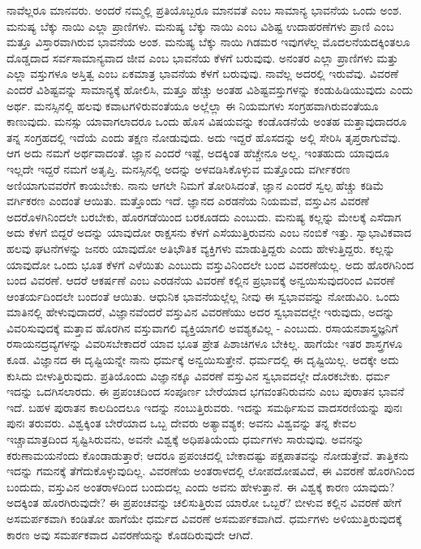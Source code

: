 ನಾವೆಲ್ಲರೂ ಮಾನವರು. ಅಂದರೆ ನಮ್ಮಲ್ಲಿ ಪ್ರತಿಯೊಬ್ಬರೂ ಮಾನವತೆ ಎಂಬ ಸಾಮಾನ್ಯ ಭಾವನೆಯ ಒಂದು ಅಂಶ. ಮನುಷ್ಯ ಬೆಕ್ಕು ನಾಯಿ ಎಲ್ಲಾ ಪ್ರಾಣಿಗಳು. ಮನುಷ್ಯ ಬೆಕ್ಕು ನಾಯಿ ಎಂಬ ವಿಶಿಷ್ಟ ಉದಾಹರಣೆಗಳು ಪ್ರಾಣಿ ಎಂಬ ಮತ್ತೂ ವಿಸ್ತಾರವಾಗಿರುವ ಭಾವನೆಯ ಅಂಶ. ಮನುಷ್ಯ ಬೆಕ್ಕು ನಾಯಿ ಗಿಡಮರ ಇವುಗಳೆಲ್ಲ ಮೊದಲನೆಯದಕ್ಕಿಂತಲೂ ದೊಡ್ಡದಾದ ಸರ್ವಸಾಮಾನ್ಯವಾದ ಜೀವ ಎಂಬ ಭಾವನೆಯ ಕೆಳಗೆ ಬರುವುವು. ಅನಂತರ ಎಲ್ಲಾ ಪ್ರಾಣಿಗಳು ಮತ್ತು ಎಲ್ಲಾ ವಸ್ತುಗಳೂ ಅಸ್ತಿತ್ವ ಎಂಬ ಏಕಮಾತ್ರ ಭಾವನೆಯ ಕೆಳಗೆ ಬರುವುವು. ನಾವೆಲ್ಲ ಅದರಲ್ಲಿ ಇರುವೆವು. ವಿವರಣೆ ಎಂದರೆ ವಿಶಿಷ್ಟವನ್ನು ಸಾಮಾನ್ಯಕ್ಕೆ ಹೋಲಿಸಿ, ಮತ್ತೂ ಹೆಚ್ಚು ಅಂತಹ ವಿಶಿಷ್ಟ\break ವಸ್ತುಗಳನ್ನು ಕಂಡುಹಿಡಿಯುವುದು ಎಂದು ಅರ್ಥ. ಮನಸ್ಸಿನಲ್ಲಿ ಹಲವು ಕವಾಟಗಳಿರುವಂತೆಯೂ ಅಲ್ಲೆಲ್ಲಾ ಈ ನಿಯಮಗಳು ಸಂಗ್ರಹವಾಗಿರುವಂತೆಯೂ ಕಾಣುವುದು. ಮನಸ್ಸು ಯಾವಾಗಲಾದರೂ ಒಂದು ಹೊಸ ವಿಷಯವನ್ನು ಕಂಡೊಡನೆಯೆ ಅಂತಹ ಮತ್ತಾವುದಾದರೂ ತನ್ನ ಸಂಗ್ರಹದಲ್ಲಿ ಇದೆಯೆ ಎಂದು ತಕ್ಷಣ ನೋಡುವುದು. ಅದು ಇದ್ದರೆ ಹೊಸದನ್ನು ಅಲ್ಲಿ ಸೇರಿಸಿ ತೃಪ್ತರಾಗುವೆವು. ಆಗ ಅದು ನಮಗೆ ಅರ್ಥವಾದಂತೆ. ಜ್ಞಾನ ಎಂದರೆ ಇಷ್ಟೆ, ಅದಕ್ಕಿಂತ ಹೆಚ್ಚೇನೂ ಅಲ್ಲ. ಇಂತಹುದು ಯಾವುದೂ ಇಲ್ಲದೇ ಇದ್ದರೆ ನಮಗೆ ಅತೃಪ್ತಿ. ಮನಸ್ಸಿನಲ್ಲಿ ಅದನ್ನು ಅಳವಡಿಸಿಕೊಳ್ಳುವ ಮತ್ತೊಂದು ವರ್ಗೀಕರಣ ಅಣಿಯಾಗುವವರೆಗೆ ಕಾಯಬೇಕು. ನಾನು ಆಗಲೇ ನಿಮಗೆ ತೋರಿಸಿದಂತೆ, ಜ್ಞಾನ ಎಂದರೆ ಸ್ವಲ್ಪ ಹೆಚ್ಚು ಕಡಿಮೆ ವರ್ಗಿಕರಣ ಎಂದಂತೆ ಆಯಿತು. ಮತ್ತೊಂದು ಇದೆ. ಜ್ಞಾನದ ಎರಡನೆಯ ನಿಯಮವೆ, ವಸ್ತುವಿನ ವಿವರಣೆ ಅದರೊಳಗಿನಿಂದಲೇ ಬರಬೇಕು, ಹೊರಗಡೆಯಿಂದ ಬರಕೂಡದು ಎಂಬುದು. ಮನುಷ್ಯ ಕಲ್ಲನ್ನು ಮೇಲಕ್ಕೆ ಎಸೆದಾಗ ಅದು ಕೆಳಗೆ ಬಿದ್ದರೆ ಅದನ್ನು ಯಾವುದೋ ರಾಕ್ಷಸನು ಕೆಳಗೆ ಎಸೆಯುತ್ತಿರುವನು ಎಂಬ ನಂಬಿಕೆ ಇತ್ತು. ಸ್ವಾಭಾವಿಕವಾದ ಹಲವು ಘಟನೆಗಳನ್ನು ಜನರು ಯಾವುದೋ ಅತಿಭೌತಿಕ ವ್ಯಕ್ತಿಗಳು ಮಾಡುತ್ತಿದ್ದರು ಎಂದು ಹೇಳುತ್ತಿದ್ದರು. ಕಲ್ಲನ್ನು ಯಾವುದೋ ಒಂದು ಭೂತ ಕೆಳಗೆ ಎಳೆಯಿತು ಎಂಬುದು ವಸ್ತುವಿನಿಂದಲೇ ಬಂದ ವಿವರಣೆಯಲ್ಲ. ಅದು ಹೊರಗಿನಿಂದ ಬಂದ ವಿವರಣೆ. ಆದರೆ ಆಕರ್ಷಣೆ ಎಂಬ ಎರಡನೆಯ ವಿವರಣೆ ಕಲ್ಲಿನ ಪ್ರಭಾವಕ್ಕೆ ಅನ್ವಯಿಸುವುದರಿಂದ ವಿವರಣೆ ಆಂತರ್ಯದಿಂದಲೇ ಬಂದಂತೆ ಆಯಿತು. ಆಧುನಿಕ ಭಾವನೆಯಲ್ಲೆಲ್ಲ ನೀವು ಈ ಸ್ವಭಾವವನ್ನು ನೋಡುವಿರಿ. ಒಂದು ಮಾತಿನಲ್ಲಿ ಹೇಳುವುದಾದರೆ, ವಿಜ್ಞಾನವೆಂದರೆ ವಸ್ತುವಿನ ವಿವರಣೆಯು ಅದರ ಸ್ವಭಾವದಲ್ಲೇ ಇರುವುದು, ಅದನ್ನು ವಿವರಿಸುವುದಕ್ಕೆ ಮತ್ತಾವ ಹೊರಗಿನ ವಸ್ತುವಾಗಲಿ ವ್ಯಕ್ತಿಯಾಗಲಿ ಅವಶ್ಯಕವಿಲ್ಲ - ಎಂಬುದು. ರಸಾಯನಶಾಸ್ತ್ರಜ್ಞನಿಗೆ ರಸಾಯನದ್ರವ್ಯಗಳನ್ನು ವಿವರಿಸಬೇಕಾದರೆ ಯಾವ ಭೂತ ಪ್ರೇತ ಪಿಶಾಚಿಗಳೂ ಬೇಕಿಲ್ಲ. ಹಾಗೆಯೇ ಇತರ ಶಾಸ್ತ್ರಗಳೂ ಕೂಡ. ವಿಜ್ಞಾನದ ಈ ದೃಷ್ಟಿಯನ್ನೇ ನಾನು ಧರ್ಮಕ್ಕೆ ಅನ್ವಯಿಸುತ್ತೇನೆ. ಧರ್ಮದಲ್ಲಿ ಈ ದೃಷ್ಟಿಯಿಲ್ಲ. ಅದಕ್ಕೇ ಅದು ಕುಸಿದು ಬೀಳುತ್ತಿರುವುದು. ಪ್ರತಿಯೊಂದು ವಿಜ್ಞಾನಕ್ಕೂ ವಿವರಣೆ ವಸ್ತುವಿನ ಸ್ವಭಾವದಲ್ಲೇ ದೊರಕಬೇಕು. ಧರ್ಮ ಇದನ್ನು ಒದಗಿಸಲಾರದು. ಈ ಪ್ರಪಂಚದಿಂದ ಸಂಪೂರ್ಣ ಬೇರೆಯಾದ ಭಗವಂತನಿರುವನು ಎಂಬ ಪುರಾತನ ಭಾವನೆ ಇದೆ. ಬಹಳ ಪುರಾತನ ಕಾಲದಿಂದಲೂ ಇದನ್ನು ನಂಬುತ್ತಿರುವರು. ಇದನ್ನು ಸಮರ್ಥಿಸುವ ವಾದಸರಣಿಯನ್ನು ಪುನಃ ಪುನಃ ತರುವರು. ವಿಶ್ವಕ್ಕಿಂತ ಬೇರೆಯಾದ ಒಬ್ಬ ದೇವರು ಅತ್ಯಾವಶ್ಯಕ; ಅವನು ವಿಶ್ವವನ್ನು ತನ್ನ ಕೇವಲ ಇಚ್ಚಾಮಾತ್ರದಿಂದ ಸೃಷ್ಟಿಸಿರುವನು, ಅವನೇ ವಿಶ್ವಕ್ಕೆ ಅಧಿಪತಿಯೆಂದು ಧರ್ಮಗಳು ಸಾರುವುವು. ಅವನನ್ನು ಕರುಣಾಮಯನೆಂದು ಕೊಂಡಾಡುತ್ತಾರೆ; ಆದರೂ ಪ್ರಪಂಚದಲ್ಲಿ ಬೇಕಾದಷ್ಟು ಪಕ್ಷಪಾತವನ್ನು ನೋಡುತ್ತೇವೆ. ತಾತ್ತಿಕನು ಇದನ್ನು ಗಮನಕ್ಕೆ ತೆಗೆದುಕೊಳ್ಳುವುದಿಲ್ಲ. ವಿವರಣೆಯ ಅಂತರಾಳದಲ್ಲಿ ಲೋಪದೋಷವಿದೆ, ಈ ವಿವರಣೆ ಹೊರಗಿನಿಂದ ಬಂದುದು, ವಸ್ತುವಿನ ಅಂತರಾಳದಿಂದ ಬಂದುದಲ್ಲ ಎಂದು ಅವನು ಹೇಳುತ್ತಾನೆ. ಈ ವಿಶ್ವಕ್ಕೆ ಕಾರಣ ಯಾವುದು? ಅದಕ್ಕಿಂತ ಹೊರಗಿರುವುದೇ? ಈ ಪ್ರಪಂಚವನ್ನು ಚಲಿಸುತ್ತಿರುವ ಯಾರೋ ಒಬ್ಬರೆ? ಬೀಳುವ ಕಲ್ಲಿನ ವಿವರಣೆ ಹೇಗೆ ಅಸಮರ್ಪಕವಾಗಿ ಕಂಡಿತೋ ಹಾಗೆಯೇ ಧರ್ಮದ ವಿವರಣೆ ಅಸಮರ್ಪಕವಾಗಿದೆ. ಧರ್ಮಗಳು ಅಳಿಯುತ್ತಿರುವುದಕ್ಕೆ ಕಾರಣ ಅವು ಸಮರ್ಪಕವಾದ ವಿವರಣೆಯನ್ನು ಕೊಡದಿರುವುದೇ ಆಗಿದೆ.

